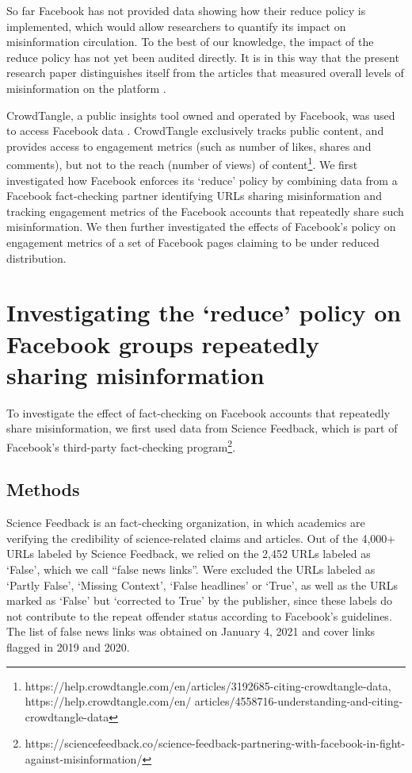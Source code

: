 \documentclass[11pt,a4paper]{article}
\begin{document}
So far Facebook has not provided data showing how their reduce policy is implemented, which would allow researchers to quantify its impact on misinformation circulation. To the best of our knowledge, the impact of the reduce policy has not yet been audited directly. It is in this way that the present research paper distinguishes itself from the articles that measured overall levels of misinformation on the platform \citep{allcott2019trends, kornbluh2020new, resnick2018iffy}. 

CrowdTangle, a public insights tool owned and operated by Facebook, was used to access Facebook data \citep{team2020crowdtangle}. CrowdTangle exclusively tracks public content, and provides access to engagement metrics (such as number of likes, shares and comments), but not to the reach (number of views) of content\footnote{https://help.crowdtangle.com/en/articles/3192685-citing-crowdtangle-data, https://help.crowdtangle.com/en/
articles/4558716-understanding-and-citing-crowdtangle-data}. We first investigated how Facebook enforces its ‘reduce’ policy by combining data from a Facebook fact-checking partner identifying URLs sharing misinformation and tracking engagement metrics of the Facebook accounts that repeatedly share such misinformation. We then further investigated the effects of Facebook’s policy on engagement metrics of a set of Facebook pages claiming to be under reduced distribution.

\section{Investigating the `reduce’ policy on Facebook groups repeatedly sharing misinformation}

To investigate the effect of fact-checking on Facebook accounts that repeatedly share misinformation, we first used data from Science Feedback, which is part of Facebook’s third-party fact-checking program\footnote{https://sciencefeedback.co/science-feedback-partnering-with-facebook-in-fight-against-misinformation/}.

\subsection{Methods}

Science Feedback is an fact-checking organization, in which academics are verifying the credibility of science-related claims and articles. Out of the 4,000+ URLs labeled by Science Feedback, we relied on the 2,452 URLs labeled as `False', which we call ``false news links''. Were excluded the URLs labeled as `Partly False', `Missing Context', `False headlines' or `True', as well as the URLs marked as `False' but `corrected to True' by the publisher, since these labels do not contribute to the repeat offender status according to Facebook's guidelines. The list of false news links was obtained on January 4, 2021 and cover links flagged in 2019 and 2020.
\end{document}
